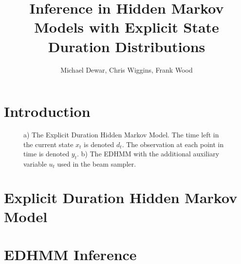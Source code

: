 \documentclass[journal]{../inc/oldtran/IEEEtran}
\title{Inference in Hidden Markov Models with Explicit State Duration Distributions}
\author{Michael Dewar, Chris Wiggins, Frank Wood}
\begin{document}
    
\maketitle

\begin{abstract}

\end{abstract}

\section{Introduction}



    \begin{figure}[t]
        \centering
        \caption{a) The Explicit Duration Hidden Markov Model. The time left in the current state $x_t$ is denoted $d_t$. The observation at each point in time is denoted $y_t$. b) The EDHMM with the additional auxiliary variable $u_t$ used in the beam sampler.}
    \label{fig:graphs}    
    \end{figure}
\section{Explicit Duration Hidden Markov Model}
\label{sec:Model}





\section{EDHMM Inference}

\label{sec:inference}


\end{document}
